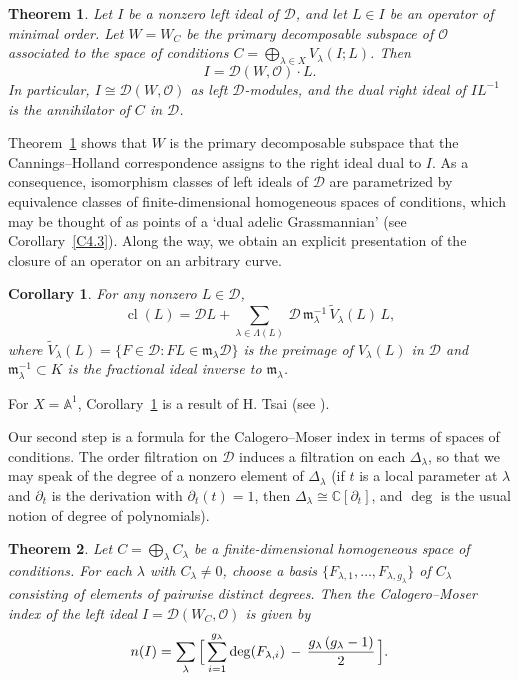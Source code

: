 \documentclass[11pt,reqno]{amsart}
\theoremstyle{plain}
\newtheorem{theorem}{Theorem}[section]
\newtheorem{corollary}{Corollary}[section]
\theoremstyle{definition}
\theoremstyle{remark}
\numberwithin{equation}{section}
\newcommand{\cD}{\mathcal{D}}
\newcommand{\cO}{\mathcal{O}}
\newcommand{\C}{\mathbb{C}}
\newcommand{\A}{\mathbb{A}}
\newcommand{\del}{\partial}
\newcommand{\ml}{\mathfrak{m}_\lambda}
\newcommand{\Dl}{\Delta_\lambda}
\DeclareMathOperator{\cl}{cl}
\begin{document}
\begin{theorem}
\label{T1.1}
Let $I$ be a nonzero left ideal of $\cD$, and let $L \in I$ be an operator of minimal order. Let
$W = W_C$ be the primary decomposable subspace of $\cO$ associated to the space of conditions
$C = \bigoplus_{\lambda \in X} V_\lambda(I;L)$. Then
\[
  I = \cD(W, \cO) \cdot L .
\]
In particular, $I \cong \cD(W,\cO)$ as left $\cD$-modules, and the dual right ideal of
$I L^{-1}$ is the annihilator of $C$ in $\cD$.
\end{theorem}

Theorem~\ref{T1.1} shows that $W$ is the primary decomposable subspace that the
Cannings--Holland correspondence assigns to the right ideal dual to $I$. As a consequence,
isomorphism classes of left ideals of $\cD$ are parametrized by equivalence classes of
finite-dimensional homogeneous spaces of conditions, which may be thought of as points of a
`dual adelic Grassmannian' (see Corollary~\ref{C4.3}). Along the way, we obtain an explicit
presentation of the closure of an operator on an arbitrary curve.

\begin{corollary}
\label{C1.1}
For any nonzero $L \in \cD$,
\[
  \cl(L) = \cD L + \sum_{\lambda \in \Lambda(L)}\, \cD\, \ml^{-1}\, \widetilde{V}_\lambda(L)\, L ,
\]
where $\widetilde{V}_\lambda(L) = \{F \in \cD : F L \in \ml \cD\}$ is the preimage of
$V_\lambda(L)$ in $\cD$ and $\ml^{-1} \subset K$ is the fractional ideal inverse to $\ml$.
\end{corollary}

For $X = \A^1$, Corollary~\ref{C1.1} is a result of H. Tsai (see \cite[Algorithm~3.4]{Tsai}).

Our second step is a formula for the Calogero--Moser index in terms of spaces of conditions. The
order filtration on $\cD$ induces a filtration on each $\Dl$, so that we may speak of the degree
of a nonzero element of $\Dl$ (if $t$ is a local parameter at $\lambda$ and $\del_t$ is the
derivation with $\del_t(t) = 1$, then $\Dl \cong \C[\del_t]$, and $\deg$ is the usual notion of degree of
polynomials).

\begin{theorem}
\label{T1.2}
Let $C = \bigoplus_{\lambda} C_\lambda$ be a finite-dimensional homogeneous space of conditions.
For each $\lambda$ with $C_\lambda \ne 0$, choose a basis $\{F_{\lambda,1}, \ldots,
F_{\lambda, g_\lambda}\}$ of $C_\lambda$ consisting of elements of pairwise distinct degrees.
Then the Calogero--Moser index of the left ideal $I = \cD(W_C, \cO)$ is given by
\begin{equation}
\label{E19}
  n(I) = \sum_{\lambda}\, \Bigl[\, \sum_{i=1}^{g_\lambda} \deg(F_{\lambda,i})\, -\,
  \frac{g_\lambda\,(g_\lambda - 1)}{2} \,\Bigr] .
\end{equation}
\end{theorem}
\end{document}
